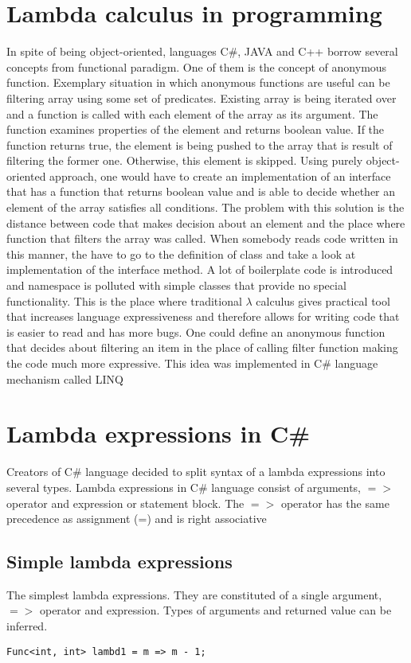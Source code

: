 \documentclass[]{report}
\begin{document}
    \section{Lambda calculus in programming}
    
    In spite of being object-oriented, languages C\#, JAVA and C++ borrow several concepts from functional paradigm. One of them is the concept of anonymous function. Exemplary situation in which anonymous functions are useful can be filtering array using some set of predicates. Existing array is being iterated over and a function is called with each element of the array as its argument. The function examines properties of the element and returns boolean value. If the function returns true, the element is being pushed to the array that is result of filtering the former one. Otherwise, this element is skipped. 
    Using purely object-oriented approach, one would have to create an implementation of an interface that has a function that returns boolean value and is able to decide whether an element of the array satisfies all conditions. The problem with this solution is the distance between code that makes decision about an element and the place where function that filters the array was called. When somebody reads code written in this manner, the have to go to the definition of class and take a look at implementation of the interface method. A lot of boilerplate code is introduced and namespace is polluted with simple classes that provide no special functionality.
    This is the place where traditional $\lambda$ calculus gives practical tool that increases language expressiveness and therefore allows for writing code that is easier to read and has more bugs. One could define an anonymous function that decides about filtering an item in the place of calling filter function making the code much more expressive. This idea was implemented in C\# language mechanism called LINQ 
    
    \section{Lambda expressions in C\#}\label{lambdatypes}
    Creators of C\# language decided to split syntax of a lambda expressions into several types.
    Lambda expressions in C\# language consist of arguments, $=>$ operator and expression or statement block.
    The $=>$ operator has the same precedence as assignment (=) and is right associative \cite{csharplambdasyntax}
    
    \subsection{Simple lambda expressions}
    The simplest lambda expressions. They are constituted of a single argument, $=>$ operator and expression. Types of arguments and returned value can be inferred. 
    \begin{lstlisting}[style=sharpc, caption=This lambda has single integer argument m and returns an integer m - 1]
    Func<int, int> lambd1 = m => m - 1;
    \end{lstlisting}
\end{document}
